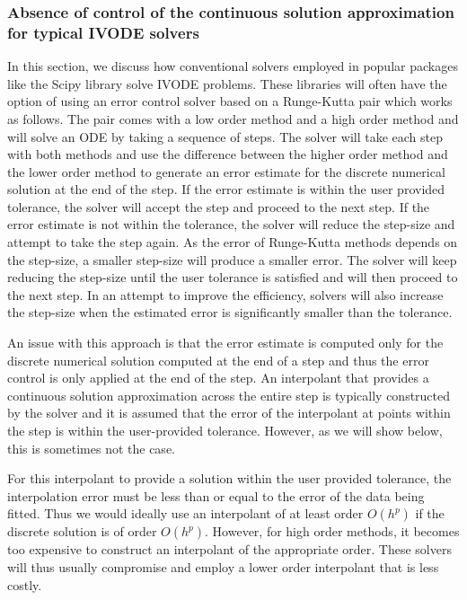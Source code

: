 \documentclass{article}
\begin{document}
\subsubsection{Absence of control of the continuous solution approximation for typical IVODE solvers}
\label{section:end_of_step_innacurate}
In this section, we discuss how conventional solvers employed in popular packages like the Scipy library solve IVODE problems. These libraries will often have the option of using an error control solver based on a Runge-Kutta pair which works as follows. The pair comes with a low order method and a high order method and will solve an ODE by taking a sequence of steps. The solver will take each step with both methods and use the difference between the higher order method and the lower order method to generate an error estimate for the discrete numerical solution at the end of the step. If the error estimate is within the user provided tolerance, the solver will accept the step and proceed to the next step. If the error estimate is not within the tolerance, the solver will reduce the step-size and attempt to take the step again. As the error of Runge-Kutta methods depends on the step-size, a smaller step-size will produce a smaller error. The solver will keep reducing the step-size until the user tolerance is satisfied and will then proceed to the next step. In an attempt to improve the efficiency, solvers will also increase the step-size when the estimated error is significantly smaller than the tolerance.

An issue with this approach is that the error estimate is computed only for the discrete numerical solution computed at the end of a step and thus the error control is only applied at the end of the step. An interpolant that provides a continuous solution approximation across the entire step is typically constructed by the solver and it is assumed that the error of the interpolant at points within the step is within the user-provided tolerance. However, as we will show below, this is sometimes not the case.

For this interpolant to provide a solution within the user provided tolerance, the interpolation error must be less than or equal to the error of the data being fitted. Thus we would ideally use an interpolant of at least order $O(h^{p})$ if the discrete solution is of order $O(h^{p})$. However, for high order methods, it becomes too expensive to construct an interpolant of the appropriate order. These solvers will thus usually compromise and employ a lower order interpolant that is less costly. 
\end{document}
